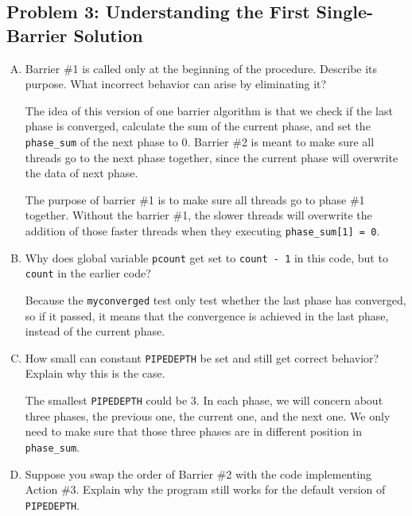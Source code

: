 \documentclass[11pt]{article}
\newenvironment{choice}{\begin{enumerate}[A.]}{\end{enumerate}}
\newenvironment{answer}{\begin{minipage}[c][1.5in]{\textwidth}}{\end{minipage}}
\begin{document}
\newpage
\subsection*{Problem 3: Understanding the First Single-Barrier Solution}

\begin{choice}
\item Barrier \#1 is called only at the beginning of the procedure.
Describe its purpose.  What incorrect behavior can arise by eliminating it?

\begin{answer}
The idea of this version of one barrier algorithm is that we check if the last phase is converged, calculate the sum of the current phase, and set the \lstinline{phase_sum} of the next phase to 0. 
Barrier \#2 is meant to make sure all threads go to the next phase together, since the current phase will overwrite the data of next phase. 

The purpose of barrier \#1 is to make sure all threads go to phase \#1 together. Without the barrier \#1, 
the slower threads will overwrite the addition of those faster threads when they executing \lstinline{phase_sum[1] = 0}. 

\end{answer}
\item Why does global variable \texttt{pcount} get set to \texttt{count - 1} in this code, but to \texttt{count} in the earlier code?

\begin{answer}
Because the \lstinline{myconverged} test only test whether the last phase has converged, so if it passed, it means that the convergence is achieved in the last phase, instead of the current phase. 
\end{answer}
\item How small can constant \texttt{PIPEDEPTH} be set and still get
  correct behavior?  Explain why this is the case.

\begin{answer}
The smallest \lstinline{PIPEDEPTH} could be 3. In each phase, we will concern about three phases, the previous one, the current one, and the next one. 
We only need to make sure that those three phases are in different position in \lstinline{phase_sum}. 
\end{answer}
\item Suppose you swap the order of Barrier \#2 with the code
  implementing Action \#3.
Explain why the program still works for the
  default version of \texttt{PIPEDEPTH}.


\end{choice}
\end{document}
